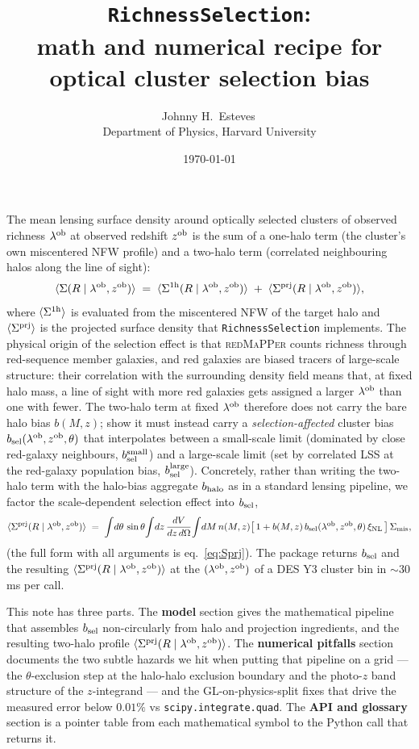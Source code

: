 \documentclass[a4paper, 11pt]{article}
\title{\texorpdfstring{%
\textcolor{harvardcrimson}{\textbf{\texttt{RichnessSelection}:\\
math and numerical recipe for optical cluster selection bias}}%
}{RichnessSelection: math and numerical recipe}}
\author{Johnny H.\ Esteves\,\orcidlink{0000-0003-4373-2386}\\[2pt]
{\small Department of Physics, Harvard University}}
\date{\today}
\newcommand{\lob}{\lambda^{\rm ob}}
\newcommand{\zob}{z^{\rm ob}}
\newcommand{\xinl}{\xi_{\rm NL}}
\newcommand{\bsel}{b_{\rm sel}}
\newcommand{\bhalo}{b_{\rm halo}}
\newcommand{\bsmall}{b_{\rm sel}^{\rm small}}
\newcommand{\blarge}{b_{\rm sel}^{\rm large}}
\newcommand{\Sprj}{\Sigma^{\rm prj}}
\newcommand{\Smis}{\Sigma_{\rm mis}}
\newcommand{\avg}[1]{\langle #1 \rangle}
\begin{document}
\maketitle
\thispagestyle{fancy}

\noindent
The mean lensing surface density around optically selected
clusters of observed richness \(\lob\) at observed redshift
\(\zob\) is the sum of a one-halo term (the cluster's own
miscentered NFW profile) and a two-halo term (correlated
neighbouring halos along the line of sight):
\begin{equation}
\avg{\Sigma(R\mid\lob,\zob)} \;=\;
\avg{\Sigma^{\rm 1h}(R\mid\lob,\zob)} \;+\;
\avg{\Sprj(R\mid\lob,\zob)},
\label{eq:sigma_split}
\end{equation}
where \(\avg{\Sigma^{\rm 1h}}\) is evaluated from the miscentered
NFW of the target halo and \(\avg{\Sprj}\) is the projected
surface density that \texttt{RichnessSelection} implements. The
physical origin of the selection effect is that \textsc{redMaPPer}
counts richness through red-sequence member galaxies, and red
galaxies are biased tracers of large-scale structure: their
correlation with the surrounding density field means that, at
fixed halo mass, a line of sight with more red galaxies gets
assigned a larger \(\lob\) than one with fewer. The two-halo term
at fixed \(\lob\) therefore does not carry the bare halo bias
\(b(M,z)\); \citet{Costanzi2026} show it must instead carry a
\emph{selection-affected} cluster bias
\(\bsel(\lob,\zob,\theta)\) that interpolates between a
small-scale limit (dominated by close red-galaxy neighbours,
\(\bsmall\)) and a large-scale limit (set by correlated LSS at
the red-galaxy population bias, \(\blarge\)). Concretely,
rather than writing the two-halo term with the halo-bias aggregate
\(\bhalo\) as in a standard lensing pipeline, we factor the
scale-dependent selection effect into \(\bsel\),
\begin{equation}
\avg{\Sprj(R\mid\lob,\zob)}
\;=\; \int\!d\theta\,\sin\theta\!\int\!dz\,\frac{dV}{dz\,d\Omega}\!
      \int\!dM\,n(M,z)\bigl[\,1 + b(M,z)\,\bsel(\lob,\zob,\theta)\,\xinl\,\bigr]\,
      \Smis,
\end{equation}
(the full form with all arguments is eq.~\eqref{eq:Sprj}). The
package returns \(\bsel\) and the resulting
\(\avg{\Sprj(R\mid\lob,\zob)}\) at the \((\lob,\zob)\) of a DES Y3
cluster bin in \(\sim 30\) ms per call.

This note has three parts. The \textbf{model} section gives the
mathematical pipeline that assembles \(\bsel\) non-circularly from
halo and projection ingredients, and the resulting two-halo
profile \(\avg{\Sprj(R\mid\lob,\zob)}\). The \textbf{numerical
pitfalls} section documents the two subtle hazards we hit when
putting that pipeline on a grid --- the \(\theta\)-exclusion step
at the halo-halo exclusion boundary and the photo-\(z\) band
structure of the \(z\)-integrand --- and the GL-on-physics-split
fixes that drive the measured error below \(0.01\%\) vs
\texttt{scipy.integrate.quad}. The \textbf{API and glossary}
section is a pointer table from each mathematical symbol to the
Python call that returns it.
\end{document}

